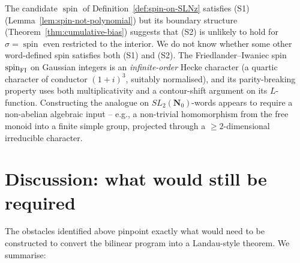 \documentclass[11pt]{article}
\theoremstyle{definition}
\newcommand{\Nz}{\mathbf{N}_0}
\newcommand{\SLNz}{SL_2(\Nz)}
\DeclareMathOperator{\spin}{spin}
\begin{document}
The candidate $\spin$ of Definition~\ref{def:spin-on-SLNz} satisfies
(S1) (Lemma~\ref{lem:spin-not-polynomial}) but its boundary structure
(Theorem~\ref{thm:cumulative-bias}) suggests that (S2) is unlikely to
hold for $\sigma=\spin$ even restricted to the interior. We do not know
whether some other word-defined spin satisfies both (S1) and (S2). The
Friedlander--Iwaniec spin $\spin_{\textnormal{FI}}$ on Gaussian integers
is an \emph{infinite-order} Hecke character (a quartic character of
conductor $(1+i)^{3}$, suitably normalised), and its parity-breaking
property uses both multiplicativity and a contour-shift argument on its
$L$-function. Constructing the analogue on $\SLNz$-words appears to
require a non-abelian algebraic input -- e.g., a non-trivial
homomorphism from the free monoid into a finite simple group, projected
through a $\ge 2$-dimensional irreducible character.

\section{Discussion: what would still be required}\label{sec:discussion}

The obstacles identified above pinpoint exactly what would need to be
constructed to convert the bilinear program into a Landau-style theorem.
We summarise:
\end{document}

